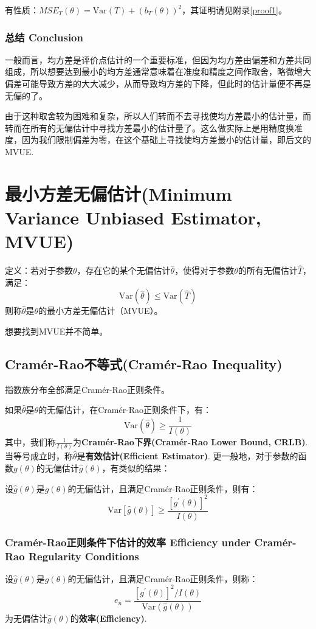 \documentclass[UTF8]{ctexbook}
\begin{document}
有性质：$MSE_T(\theta)=\mathrm{Var}(T)+(b_T(\theta))^2$，其证明请见附录\ref{proof1}。
\subsubsection{总结 Conclusion}
一般而言，均方差是评价点估计的一个重要标准，但因为均方差由偏差和方差共同组成，所以想要达到最小的均方差通常意味着在准度和精度之间作取舍，略微增大偏差可能导致方差的大大减少，从而导致均方差的下降，但此时的估计量便不再是无偏的了。

由于这种取舍较为困难和复杂，所以人们转而不去寻找使均方差最小的估计量，而转而在所有的无偏估计中寻找方差最小的估计量了。这么做实际上是用精度换准度，因为我们限制偏差为零，在这个基础上寻找使均方差最小的估计量，即后文的MVUE.
\section{最小方差无偏估计(Minimum Variance Unbiased Estimator, MVUE)}
定义：若对于参数$\theta$，存在它的某个无偏估计$\hat\theta$，使得对于参数$\theta$的所有无偏估计$\hat T$，满足：
\[
	\mathrm{Var}(\hat\theta)\leq\mathrm{Var}(\hat T)
\]
则称$\hat\theta$是$\theta$的最小方差无偏估计（MVUE）。

想要找到MVUE并不简单。
\subsection{Cramér-Rao不等式(Cramér-Rao Inequality)}
指数族分布全部满足Cramér-Rao正则条件。

如果$\hat\theta$是$\theta$的无偏估计，在Cramér-Rao正则条件下，有：
\[
	\mathrm{Var}(\hat\theta)\geq\frac{1}{I(\theta)}
\]
其中，我们称$\frac{1}{I(\theta)}$为\textbf{Cramér-Rao下界(Cramér-Rao Lower Bound, CRLB)}. 当等号成立时，称$\hat\theta$是\textbf{有效估计(Efficient Estimator)}. 更一般地，对于参数的函数$g(\theta)$的无偏估计$\hat g(\theta)$，有类似的结果：

设$\hat g(\theta)$是$g(\theta)$的无偏估计，且满足Cramér-Rao正则条件，则有：
\[
	\mathrm{Var}[\hat g(\theta)]\geq\frac{[g^{'}(\theta)]^2}{I(\theta)}
\]
\subsubsection{Cramér-Rao正则条件下估计的效率 Efficiency under Cramér-Rao Regularity Conditions}
设$\hat g(\theta)$是$g(\theta)$的无偏估计，且满足Cramér-Rao正则条件，则称：
\[
	e_n=\frac{[g^{'}(\theta)]^2/I(\theta)}{\mathrm{Var}(\hat g(\theta))}
\]
为无偏估计$\hat g(\theta)$的\textbf{效率(Efficiency)}.
\end{document}
